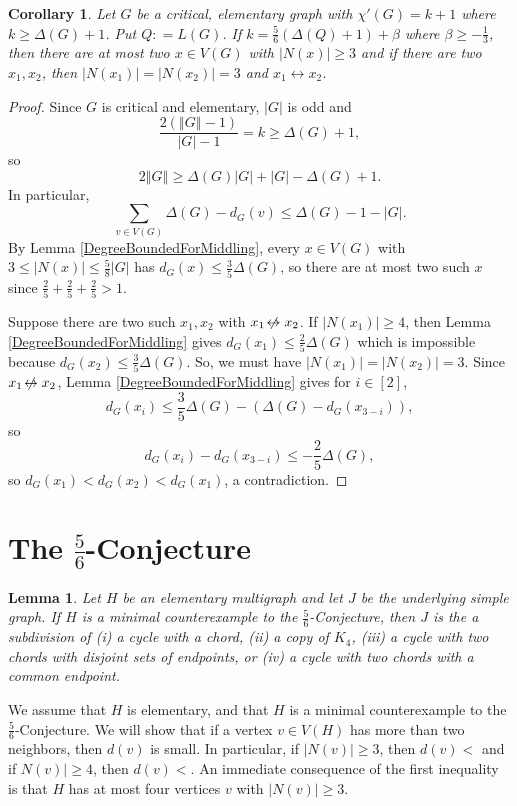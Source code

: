 \documentclass[12pt]{amsart}
\theoremstyle{plain}
\newtheorem{lem}[thm]{Lemma}
\newtheorem{cor}[thm]{Corollary}
\theoremstyle{definition}
\theoremstyle{remark}
\newcommand{\card}[1]{\left|#1\right|}
\newcommand{\size}[1]{\left\Vert#1\right\Vert}
\newcommand{\irange}[1]{\left[#1\right]}
\newcommand{\parens}[1]{\left( #1 \right)}
\newcommand{\DefinedAs}{\mathrel{\mathop:}=}
\def\adj{\leftrightarrow}
\def\nonadj{\not\!\leftrightarrow}
\begin{document}
\begin{cor}
Let $G$ be a critical, elementary graph with $\chi'(G) = k + 1$ where $k \ge \Delta(G) + 1$.  Put $Q \DefinedAs L(G)$. 
If $k = \frac56\parens{\Delta(Q) + 1} + \beta$ where $\beta \ge -\frac13$, then there are at most two $x \in V(G)$ with $\card{N(x)} \ge 3$
and if there are two $x_1, x_2$, then $\card{N(x_1)} = \card{N(x_2)} = 3$ and $x_1 \adj x_2$.
\end{cor}
\begin{proof}
Since $G$ is critical and elementary, $\card{G}$ is odd and
\[\frac{2(\size{G} - 1)}{\card{G} - 1} = k \ge \Delta(G) + 1,\]
so
\[2\size{G} \ge \Delta(G)\card{G} + \card{G} - \Delta(G) + 1.\]
In particular,
\[\sum_{v \in V(G)} \Delta(G) - d_G(v) \le \Delta(G) - 1 - \card{G}.\]
By Lemma \ref{DegreeBoundedForMiddling}, every $x \in V(G)$ with $3 \le \card{N(x)} \le \frac58\card{G}$ has $d_G(x) \le \frac35\Delta(G)$, so there are at most two such $x$ since
$\frac25 + \frac25 + \frac25 > 1$.

Suppose there are two such $x_1, x_2$ with $x_1 \nonadj x_2$.  If $\card{N(x_1)} \ge 4$, then Lemma \ref{DegreeBoundedForMiddling} gives $d_G(x_1) \le \frac25\Delta(G)$ which is impossible because $d_G(x_2) \le \frac35\Delta(G)$.  So, we must have $\card{N(x_1)} = \card{N(x_2)} = 3$.  Since $x_1 \nonadj x_2$, Lemma \ref{DegreeBoundedForMiddling} gives for $i \in \irange{2}$,
\[d_G(x_i) \le \frac35\Delta(G) - (\Delta(G) - d_G(x_{3-i})),\]
so
\[d_G(x_i) - d_G(x_{3-i}) \le -\frac25\Delta(G),\]
so $d_G(x_1) < d_G(x_2) < d_G(x_1)$, a contradiction.
\end{proof}

\section{The $\frac56$-Conjecture}
\label{sec:56}
\begin{lem}
\label{56helper}
Let $H$ be an elementary multigraph and let $J$ be the underlying simple graph.
If $H$ is a minimal counterexample to the $\frac56$-Conjecture, then
$J$ is the a subdivision of (i) a cycle with a chord, 
(ii) a copy of $K_4$,
(iii) a cycle with two
chords with disjoint sets of endpoints, or 
(iv) a cycle with two chords with a common endpoint.
\end{lem}
We assume that $H$ is elementary, and that $H$ is a minimal counterexample to
the $\frac56$-Conjecture.  We will show that if a vertex $v\in V(H)$ has more
than two neighbors, then $d(v)$ is small.  In particular, if $|N(v)|\ge 3$, then
$d(v)<$ and if $N(v)|\ge 4$, then $d(v)<$.  An immediate consequence of the
first inequality is that $H$ has at most four vertices $v$ with $|N(v)|\ge 3$.
%
\end{document}
